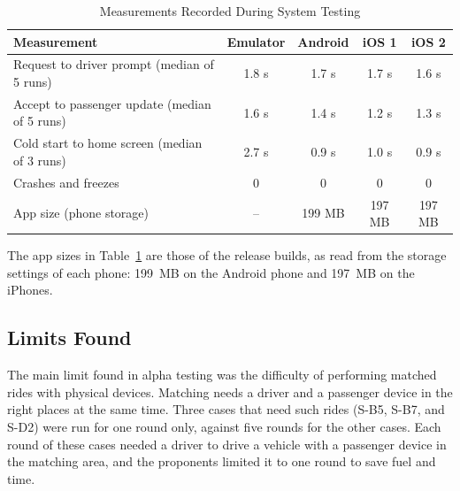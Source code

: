 \begin{table}[htbp]
    \centering
    \caption{Measurements Recorded During System Testing}
    \label{tab:measure}
    \small
    \renewcommand{\arraystretch}{1.2}
    \begin{tabular}{|>{\raggedright\arraybackslash}p{}|c|c|c|c|}
        \hline
        \textbf{Measurement} & \textbf{Emulator} & \textbf{Android} & \textbf{iOS 1} & \textbf{iOS 2} \\
        \hline
        Request to driver prompt (median of 5 runs) & 1.8 s & 1.7 s & 1.7 s & 1.6 s \\
        Accept to passenger update (median of 5 runs) & 1.6 s & 1.4 s & 1.2 s & 1.3 s \\
        Cold start to home screen (median of 3 runs) & 2.7 s & 0.9 s & 1.0 s & 0.9 s \\
        Crashes and freezes & 0 & 0 & 0 & 0 \\
        App size (phone storage) & -- & 199 MB & 197 MB & 197 MB \\
        \hline
    \end{tabular}
    \par{}
\end{table}

The app sizes in Table~\ref{tab:measure} are those of the release builds, as read from the storage settings of each phone: 199~MB on the Android phone and 197~MB on the iPhones.

\subsection{Limits Found}
The main limit found in alpha testing was the difficulty of performing matched rides with physical devices. Matching needs a driver and a passenger device in the right places at the same time. Three cases that need such rides (S-B5, S-B7, and S-D2) were run for one round only, against five rounds for the other cases. Each round of these cases needed a driver to drive a vehicle with a passenger device in the matching area, and the proponents limited it to one round to save fuel and time.

